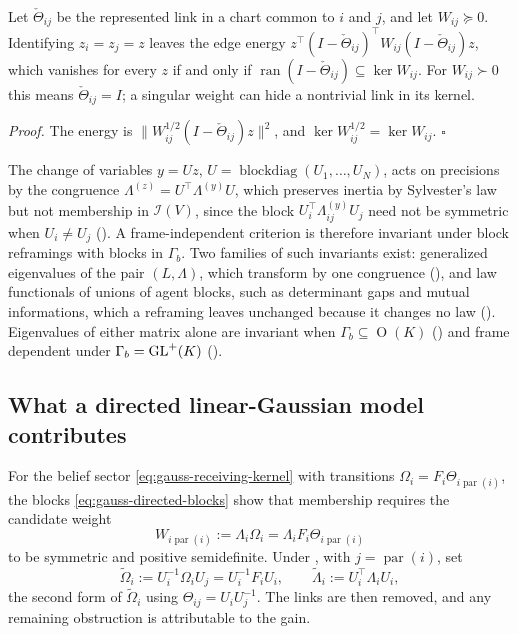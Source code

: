 Let \(\check\Theta_{ij}\) be the represented link in a chart common to \(i\)
and \(j\), and let \(W_{ij}\succeq0\). Identifying \(z_i=z_j=z\) leaves the edge
energy \(z^\top(I-\check\Theta_{ij})^\top W_{ij}(I-\check\Theta_{ij})z\),
which vanishes for every \(z\) if and only if
\(\operatorname{ran}(I-\check\Theta_{ij})\subseteq\ker W_{ij}\). For
\(W_{ij}\succ0\) this means \(\check\Theta_{ij}=I\); a singular weight can
hide a nontrivial link in its kernel. 

\noindent\emph{Proof.}
The energy is \(\lVert W_{ij}^{1/2}(I-\check\Theta_{ij})z\rVert^2\), and
\(\ker W_{ij}^{1/2}=\ker W_{ij}\). \(\square\)

The change of variables \(y=Uz\), \(U=\operatorname{blockdiag}(U_1,\dots,U_N)\),
acts on precisions by the congruence \(\Lambda^{(z)}=U^\top\Lambda^{(y)}U\),
which preserves inertia by Sylvester's law \citep[Ch.~4]{HornJohnson2013} but
not membership in \(\mathcal I(V)\), since the block
\(U_i^\top\Lambda^{(y)}_{ij}U_j\) need not be symmetric when \(U_i\neq U_j\)
(). A frame-independent criterion is
therefore invariant under block reframings with blocks in \(\Gamma_b\). Two
families of such invariants exist: generalized eigenvalues of the pair
\((L,\Lambda)\), which transform by one congruence
(), and law functionals of
unions of agent blocks, such as determinant gaps and mutual informations,
which a reframing leaves unchanged because it changes no law
(). Eigenvalues of either matrix alone are invariant when
\(\Gamma_b\subseteq\operatorname{O}(K)\) () and
frame dependent under \(\Gamma_b=\mathrm{GL}^+(K)\)
(). 

\subsection{What a directed linear-Gaussian model contributes}

For the belief sector \eqref{eq:gauss-receiving-kernel} with transitions
\(\Omega_i=F_i\Theta_{i\operatorname{par}(i)}\), the blocks
\eqref{eq:gauss-directed-blocks} show that membership requires the candidate
weight
\begin{equation}
W_{i\operatorname{par}(i)}:=\Lambda_i\Omega_i=\Lambda_iF_i\Theta_{i\operatorname{par}(i)}
\label{eq:gauss-candidate-weight}
\end{equation}
to be symmetric and positive semidefinite. Under
, with \(j=\operatorname{par}(i)\), set
\begin{equation}
\widetilde\Omega_i:=U_i^{-1}\Omega_iU_j=U_i^{-1}F_iU_i,
\qquad
\widetilde\Lambda_i:=U_i^\top\Lambda_iU_i,
\label{eq:gauss-trivialized-transition}
\end{equation}
the second form of \(\widetilde\Omega_i\) using \(\Theta_{ij}=U_iU_j^{-1}\). The
links are then removed, and any remaining obstruction is attributable to the
gain.

